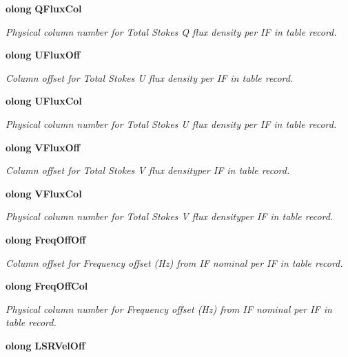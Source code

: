 \begin{CompactItemize}
{\bf olong} {\bf QFlux\-Col}
\begin{CompactList}\small\item\em Physical column number for Total Stokes Q flux density per IF in table record. \item\end{CompactList}\item 
{\bf olong} {\bf UFlux\-Off}
\begin{CompactList}\small\item\em Column offset for Total Stokes U flux density per IF in table record. \item\end{CompactList}\item 
{\bf olong} {\bf UFlux\-Col}
\begin{CompactList}\small\item\em Physical column number for Total Stokes U flux density per IF in table record. \item\end{CompactList}\item 
{\bf olong} {\bf VFlux\-Off}
\begin{CompactList}\small\item\em Column offset for Total Stokes V flux densityper IF in table record. \item\end{CompactList}\item 
{\bf olong} {\bf VFlux\-Col}
\begin{CompactList}\small\item\em Physical column number for Total Stokes V flux densityper IF in table record. \item\end{CompactList}\item 
{\bf olong} {\bf Freq\-Off\-Off}
\begin{CompactList}\small\item\em Column offset for Frequency offset (Hz) from IF nominal per IF in table record. \item\end{CompactList}\item 
{\bf olong} {\bf Freq\-Off\-Col}
\begin{CompactList}\small\item\em Physical column number for Frequency offset (Hz) from IF nominal per IF in table record. \item\end{CompactList}\item 
{\bf olong} {\bf LSRVel\-Off}

\end{CompactItemize}
